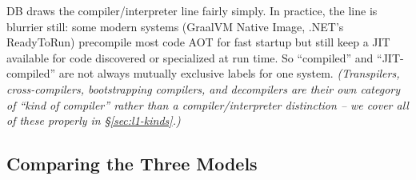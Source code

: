 \documentclass[full-course-notes.tex]{subfiles}
\begin{document}
\begin{enrichment}
DB draws the compiler/interpreter line fairly simply. In practice, the line is blurrier still:
some modern systems (GraalVM Native Image, .NET's ReadyToRun) precompile most code AOT for fast
startup but still keep a JIT available for code discovered or specialized at run time. So
``compiled'' and ``JIT-compiled'' are not always mutually exclusive labels for one system.
\emph{(Transpilers, cross-compilers, bootstrapping compilers, and decompilers are their own
category of ``kind of compiler'' rather than a compiler/interpreter distinction -- we cover all
of these properly in \S\ref{sec:l1-kinds}.)}
\end{enrichment}

\subsection{Comparing the Three Models}
\label{sec:l1-compare-three-models}
\end{document}
